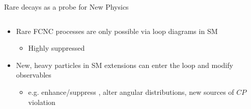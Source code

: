 \documentclass[aspectratio=1610]{beamer}
\begin{document}
\begin{frame}{Rare decays as a probe for New Physics}
  \begin{columns}
    \begin{column}{0.6\textwidth}
      \begin{itemize}
      \item Rare FCNC processes are only possible via loop diagrams in SM
        \begin{itemize}
        \item Highly suppressed
        \end{itemize}
      \item New, heavy particles in SM extensions can enter the loop and modify observables 
      \begin{itemize}
        \item e.g. enhance/suppress \BF, alter angular distributions, new sources of $CP$ violation
      \end{itemize}
      \end{itemize}
    \end{column}
    

\end{columns}
\end{frame}
\end{document}
